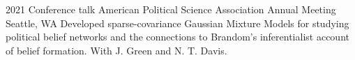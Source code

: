 \begin{cvhonors}
    \cvhonor
    {2021} %
    {Conference talk} %
    {American Political Science Association Annual Meeting} %
    {Seattle, WA} %
    {Developed sparse-covariance Gaussian Mixture Models for studying political belief networks and the connections to Brandom's inferentialist account of belief formation. With J. Green and N. T. Davis.}


\end{cvhonors}
